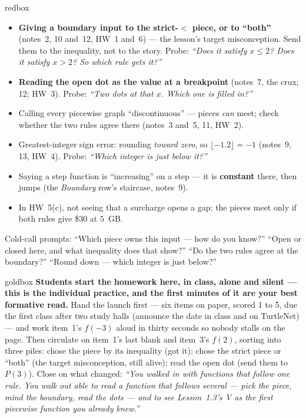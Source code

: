 \documentclass[10pt]{article}
\begin{document}
\boxguard
\begin{skillbox}{redbox}
\begin{itemize}[leftmargin=1.2em, nosep]
  \item \textbf{Giving a boundary input to the strict-$<$ piece, or to ``both''} (notes~2, 10
        and~12, HW~1 and~6) --- the lesson's target misconception. Send them to the
        inequality, not to the story. Probe: \emph{``Does it satisfy $x\le2$? Does it satisfy
        $x>2$? So which rule gets it?''}
  \item \textbf{Reading the open dot as the value at a breakpoint} (notes~7, the crux; 12;
        HW~3). Probe: \emph{``Two dots at that $x$. Which one is filled in?''}
  \item Calling every piecewise graph ``discontinuous'' --- pieces \emph{can} meet; check whether
        the two rules agree there (notes~3 and~5, 11, HW~2).
  \item Greatest-integer sign error: rounding \emph{toward zero}, so $\lfloor-1.2\rfloor=-1$
        (notes~9, 13, HW~4). Probe: \emph{``Which integer is just below it?''}
  \item Saying a step function is ``increasing'' on a step --- it is \textbf{constant} there,
        then jumps (the \emph{Boundary} row's staircase, notes~9).
  \item In HW~5(c), not seeing that a surcharge opens a gap: the pieces meet only if both rules
        give \$30 at $5$~GB.
\end{itemize}
Cold-call prompts: ``Which piece owns this input --- how do you know?'' ``Open or closed here, and
what inequality does that show?'' ``Do the two rules agree at the boundary?'' ``Round down ---
which integer is just below?''
\end{skillbox}

\boxguard
\begin{skillbox}{goldbox}
\textbf{Students start the homework here, in class, alone and silent --- this is the individual
practice, and the first minutes of it are your best formative read.} Hand the launch first ---
six items on paper, scored 1 to 5, due the first class after two study halls (announce the date in class
and on TurtleNet) --- and work item~1's $f(-3)$ aloud in thirty seconds so nobody stalls on the
page. Then circulate on item~1's last blank and item~3's $f(2)$, sorting into three piles: chose
the piece by its inequality (got it); chose the strict piece or ``both'' (the target misconception,
still alive); read the open dot (send them to $P(3)$). Close on what changed: \emph{``You walked
in with functions that follow one rule. You walk out able to read a function that follows several
--- pick the piece, mind the boundary, read the dots --- and to see Lesson~1.3's V as the first
piecewise function you already knew.''}
\end{skillbox}
\end{document}
